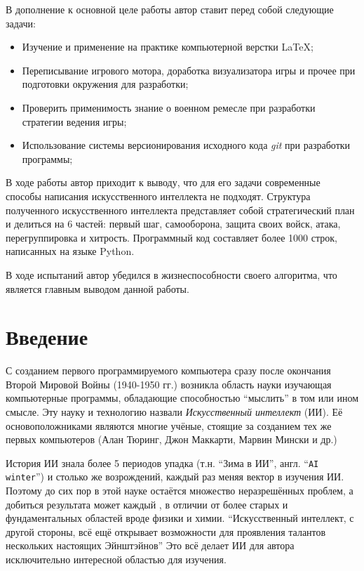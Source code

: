 \documentclass[12pt]{report}
\newenvironment{myItemize}{
	\begin{itemize}
  		\setlength{\itemsep}{1pt}
  		\setlength{\parskip}{0pt}
  		\setlength{\parsep}{0pt}
}{\end{itemize}}
\begin{document}
В дополнение к основной целе работы автор ставит перед собой следующие задачи:
\begin{myItemize}
\item Изучение и применение на практике компьютерной верстки \LaTeX;
\item Переписывание игрового мотора, доработка визуализатора игры и прочее при подготовки окружения для разработки;
\item Проверить применимость знание о военном ремесле при разработки стратегии ведения игры;
\item Использование системы версионирования исходного кода \emph{git} при разработки программы; 
\end{myItemize}

В ходе работы автор приходит к выводу, что для его задачи современные способы написания искусственного интеллекта не подходят. Структура полученного искусственного интеллекта представляет собой стратегический план и делиться на 6 частей: первый шаг, самооборона, защита своих войск, атака, перегруппировка и хитрость. Программный код составляет более 1000 строк, написанных на языке Python.

В ходе испытаний автор убедился в жизнеспособности своего алгоритма, что является главным выводом данной работы.


\chapter*{Введение}
\thispagestyle{fancy}

С созданием первого программируемого компьютера сразу после окончания Второй Мировой Войны (1940-1950 гг.) возникла область науки изучающая компьютерные программы, обладающие способностью ``мыслить'' в том или ином смысле. Эту науку и технологию назвали \emph{Искусственный интеллект} (ИИ). Её основоположниками являются многие учёные, стоящие за созданием тех же первых компьютеров (Алан Тюринг, Джон Маккарти, Марвин Мински и др.)

История ИИ знала более 5 периодов упадка (т.н. ``Зима в ИИ'', англ. ``\texttt{AI winter}'') и столько же возрождений, каждый раз меняя вектор в изучения ИИ. Поэтому до сих пор в этой науке остаётся множество неразрешённых проблем, а добиться результата может каждый \citep{russell1995}, в отличии от более старых и фундаментальных областей вроде физики и химии. ``Искусственный интеллект, с другой стороны, всё ещё открывает возможности для проявления талантов нескольких настоящих Эйнштэйнов'' \citep{russell1995} Это всё делает ИИ для автора исключительно интересной областью для изучения.
\end{document}
